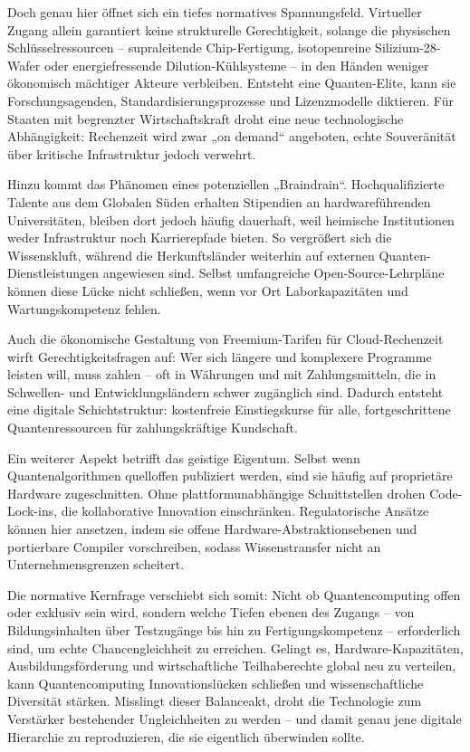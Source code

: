 Doch genau hier öffnet sich ein tiefes normatives Spannungsfeld. Virtueller Zugang allein garantiert keine strukturelle Gerechtigkeit, solange die physischen Schlüsselressourcen – supraleitende Chip-Fertigung, isotopenreine Silizium-28-Wafer oder energiefressende Dilution-Kühlsysteme – in den Händen weniger ökonomisch mächtiger Akteure verbleiben. Entsteht eine Quanten-Elite, kann sie Forschungsagenden, Standardisierungsprozesse und Lizenzmodelle diktieren. Für Staaten mit begrenzter Wirtschaftskraft droht eine neue technologische Abhängigkeit: Rechenzeit wird zwar „on demand“ angeboten, echte Souveränität über kritische Infrastruktur jedoch verwehrt.

Hinzu kommt das Phänomen eines potenziellen „Braindrain“. Hochqualifizierte Talente aus dem Globalen Süden erhalten Stipendien an hardwareführenden Universitäten, bleiben dort jedoch häufig dauerhaft, weil heimische Institutionen weder Infrastruktur noch Karrierepfade bieten. So vergrößert sich die Wissenskluft, während die Herkunftsländer weiterhin auf externen Quanten-Dienstleistungen angewiesen sind. Selbst umfangreiche Open-Source-Lehrpläne können diese Lücke nicht schließen, wenn vor Ort Laborkapazitäten und Wartungskompetenz fehlen.

Auch die ökonomische Gestaltung von Freemium-Tarifen für Cloud-Rechenzeit wirft Gerechtigkeitsfragen auf: Wer sich längere und komplexere Programme leisten will, muss zahlen – oft in Währungen und mit Zahlungsmitteln, die in Schwellen- und Entwicklungsländern schwer zugänglich sind. Dadurch entsteht eine digitale Schichtstruktur: kostenfreie Einstiegskurse für alle, fortgeschrittene Quantenressourcen für zahlungskräftige Kundschaft.

Ein weiterer Aspekt betrifft das geistige Eigentum. Selbst wenn Quantenalgorithmen quelloffen publiziert werden, sind sie häufig auf proprietäre Hardware zugeschnitten. Ohne plattformunabhängige Schnittstellen drohen Code-Lock-ins, die kollaborative Innovation einschränken. Regulatorische Ansätze können hier ansetzen, indem sie offene Hardware-Abstraktionsebenen und portierbare Compiler vorschreiben, sodass Wissenstransfer nicht an Unternehmensgrenzen scheitert.

Die normative Kernfrage verschiebt sich somit: Nicht ob Quantencomputing offen oder exklusiv sein wird, sondern welche Tiefen ebenen des Zugangs – von Bildungsinhalten über Testzugänge bis hin zu Fertigungskompetenz – erforderlich sind, um echte Chancengleichheit zu erreichen. Gelingt es, Hardware-Kapazitäten, Ausbildungsförderung und wirtschaftliche Teilhaberechte global neu zu verteilen, kann Quantencomputing Innovationslücken schließen und wissenschaftliche Diversität stärken. Misslingt dieser Balanceakt, droht die Technologie zum Verstärker bestehender Ungleichheiten zu werden – und damit genau jene digitale Hierarchie zu reproduzieren, die sie eigentlich überwinden sollte. \cite{seskirDemocratizationQuantumTechnologies2022}
